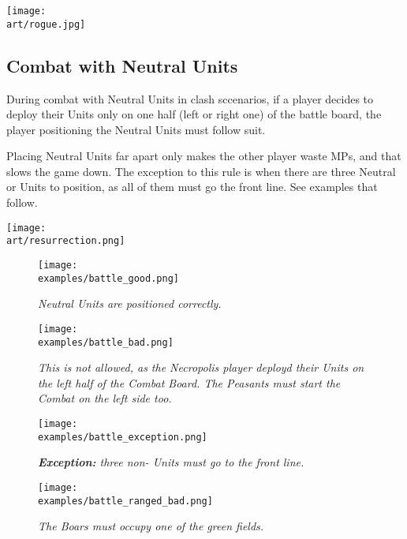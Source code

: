 \begin{multicols}{2}
\texttt{[image: \\art/rogue.jpg]}

\subsection*{Combat with Neutral Units}

During combat with Neutral Units in clash sccenarios, if a player decides to deploy their Units only on one half (left or right one) of the battle board, the player positioning the Neutral Units must follow suit.

Placing Neutral Units far apart only makes the other player waste MPs, and that slows the game down.
The exception to this rule is when there are three Neutral  or  Units to position, as all of them must go the front line.
See examples that follow.

\begin{center}
  \texttt{[image: \\art/resurrection.png]}
\end{center}

\end{multicols}

\begin{figure*}[!h]
  \mbox{}
  \hfill
  \begin{minipage}[t]{0.44\textwidth}
    \centering
    \texttt{[image: \\examples/battle\_good.png]}
    \caption[good protected]{\textit{Neutral Units are positioned correctly.}}
  \end{minipage}
  \hfill
  \begin{minipage}[t]{0.44\textwidth}
    \centering
    \texttt{[image: \\examples/battle\_bad.png]}
    \caption[bad protected]{\textit{This is not allowed, as the Necropolis player deployd their Units on the left half of the Combat Board.
      The Peasants must start the Combat on the left side too.}}
  \end{minipage}
  \hfill
  \mbox{}
\end{figure*}

\clearpage

\begin{figure*}[!h]
  \mbox{}
  \hfill
  \begin{minipage}[t]{0.44\textwidth}
    \centering
    \texttt{[image: \\examples/battle\_exception.png]}
    \caption[exception protected]{\textit{\textbf{Exception:} three non- Units must go to the front line.}}
  \end{minipage}
  \hfill
  \begin{minipage}[t]{0.44\textwidth}
    \centering
    \texttt{[image: \\examples/battle\_ranged\_bad.png]}
    \caption[ranged protected]{\textit{The Boars must occupy one of the green fields.}}
  \end{minipage}
  \hfill
  \mbox{}
\end{figure*}

